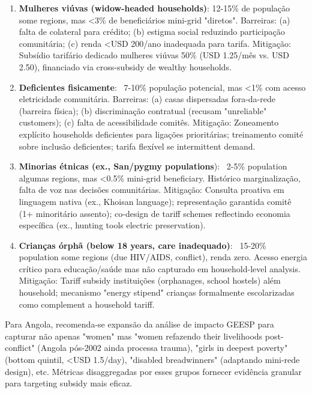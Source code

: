 \documentclass[12pt, a4paper]{article}
\begin{document}
\begin{enumerate}
\item \textbf{Mulheres viúvas (widow-headed households)}: 12-15\% de população some regions, mas <3\% de beneficiários mini-grid "diretos". Barreiras: (a) falta de colateral para crédito; (b) estigma social reduzindo participação comunitária; (c) renda <USD 200/ano inadequada para tarifa. Mitigação: Subsídio tarifário dedicado mulheres viúvas 50\% (USD 1.25/mês vs. USD 2.50), financiado via cross-subsidy de wealthy households.

\item \textbf{Deficientes fisicamente}: ~7-10\% população potencial, mas <1\% com acesso eletricidade comunitária. Barreiras: (a) casas dispersadas fora-da-rede (barreira física); (b) discriminação contratual (recusam "unreliable" customers); (c) falta de acessibilidade comitês. Mitigação: Zoneamento explícito households deficientes para ligações prioritárias; treinamento comité sobre inclusão deficientes; tarifa flexível se intermittent demand.

\item \textbf{Minorias étnicas (ex., San/pygmy populations}): ~2-5\% population algumas regions, mas <0.5\% mini-grid beneficiary. Histórico marginalização, falta de voz nas decisões comunitárias. Mitigação: Consulta proativa em linguagem nativa (ex., Khoisan language); representação garantida comitê (1+ minoritário assento); co-design de tariff schemes reflectindo economia específica (ex., hunting tools electric preservation).

\item \textbf{Crianças órphã (below 18 years, care inadequado)}: ~15-20\% population some regions (due HIV/AIDS, conflict), renda zero. Acesso energia crítico para educação/saúde mas não capturado em household-level analysis. Mitigação: Tariff subsidy instituições (orphanages, school hostels) além household; mecanismo "energy stipend" crianças formalmente escolarizadas como complement a household tariff.
\end{enumerate}

Para Angola, recomenda-se expansão da análise de impacto GEESP para capturar não apenas "women" mas "women refazendo their livelihoods post-conflict" (Angola pós-2002 ainda processa trauma), "girls in deepest poverty" (bottom quintil, <USD 1.5/day), "disabled breadwinners" (adaptando mini-rede design), etc. Métricas disaggregadas por esses grupos fornecer evidência granular para targeting subsidy mais eficaz.
\end{document}
